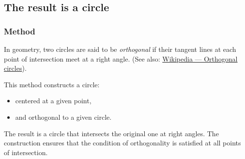 





\subsection{The result is a circle}

\subsubsection{Method }
\label{ssub:method_circle_orthogonal_from_pt}

In geometry, two circles are said to be \emph{orthogonal} if their tangent lines at each point of intersection meet at a right angle.
(See also: \href{https://en.wikipedia.org/wiki/Orthogonal_circles}{Wikipedia — Orthogonal circles}).

\medskip
\noindent
This method constructs a circle:
\begin{itemize}
  \item centered at a given point,
  \item and orthogonal to a given circle.
\end{itemize}

\noindent
The result is a circle that intersects the original one at right angles. The construction ensures that the condition of orthogonality is satisfied at all points of intersection.

\vspace{1em}

\begin{minipage}{.5\textwidth}
\begin{center}
\end{center}
\end{minipage}
\begin{minipage}{.5\textwidth}
\begin{tkzexample}
\end{tkzexample}
\end{minipage}

